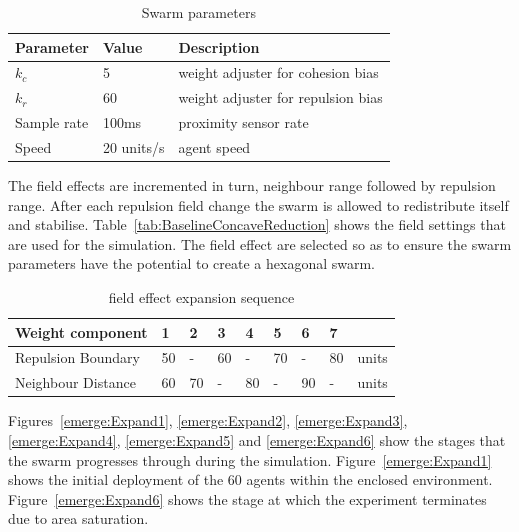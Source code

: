 \documentclass[10pt,journal,letterpaper,twoside]{IEEEtran}
\begin{document}
\begin{table}
\begin{center}
\begin{tabular}{| p{1.5cm} | p{1.5cm} | p{4.0cm} |}
\hline
\bf Parameter & \bf Value  & \bf Description \\ \hline
$k_c$         & 5          & weight adjuster for cohesion bias\\ \hline
$k_r$         & 60         & weight adjuster for repulsion bias\\ \hline
Sample rate   & 100ms      & proximity sensor rate\\ \hline
Speed         & 20 units/s & agent speed\\ \hline
\end{tabular}\caption{Swarm parameters} \label{tab:FillParameters}
\end{center}
\end{table}

The field effects are incremented in turn, neighbour range followed by repulsion range. After each repulsion field change the swarm is allowed to redistribute itself and stabilise. Table~\ref{tab:BaselineConcaveReduction} shows the field settings that are used for the simulation. The field effect are selected so as to ensure the swarm parameters have the potential to create a hexagonal swarm. 

\begin{table}
\begin{center}
\begin{tabular}{| p{1.5cm} | p{0.3cm} | p{0.3cm} | p{0.3cm} | p{0.3cm} | p{0.3cm} | p{0.3cm} | p{0.3cm} | p{0.5cm} |}
\hline
\bf Weight \bf component & \bf 1 & \bf 2 & \bf 3 & \bf 4 & \bf 5 & \bf 6 & \bf 7 & \\ \hline
Repulsion Boundary & 50 & -  & 60 & -  & 70 & -  & 80 & units\\  \hline
Neighbour Distance & 60 & 70 & -  & 80 & -  & 90 & -  & units\\  \hline
\end{tabular}\caption{field effect expansion sequence} \label{tab:FillSequence}
\end{center}
\end{table}

Figures~\ref{emerge:Expand1}, \ref{emerge:Expand2}, \ref{emerge:Expand3}, \ref{emerge:Expand4}, \ref{emerge:Expand5} and \ref{emerge:Expand6} show the stages that the swarm progresses through during the simulation. Figure~\ref{emerge:Expand1} shows the initial deployment of the 60 agents within the enclosed environment. Figure~\ref{emerge:Expand6} shows the stage at which the experiment terminates due to area saturation.
\end{document}
